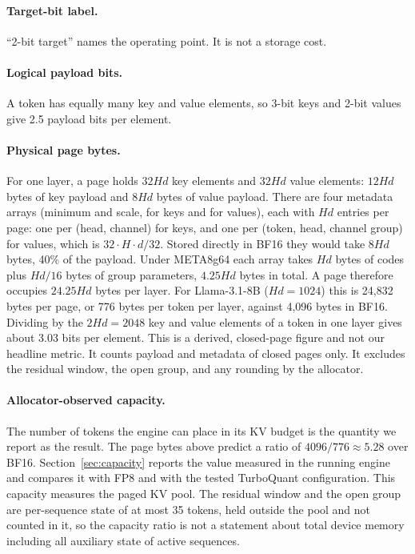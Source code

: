 \documentclass{article}
\begin{document}
\paragraph{Target-bit label.}
``2-bit target'' names the operating point. It is not a storage cost.

\paragraph{Logical payload bits.}
A token has equally many key and value elements, so 3-bit keys and 2-bit values give 2.5 payload bits
per element.

\paragraph{Physical page bytes.}
For one layer, a page holds $32Hd$ key elements and $32Hd$ value elements: $12Hd$ bytes of key payload
and $8Hd$ bytes of value payload. There are four metadata arrays (minimum and scale, for keys and for
values), each with $Hd$ entries per page: one per (head, channel) for keys, and one per (token, head,
channel group) for values, which is $32 \cdot H \cdot d/32$. Stored directly in BF16 they would take
$8Hd$ bytes, 40\% of the payload. Under META8g64 each array takes $Hd$ bytes of codes plus $Hd/16$ bytes
of group parameters, $4.25Hd$ bytes in total. A page therefore occupies $24.25Hd$ bytes per layer. For
Llama-3.1-8B ($Hd=1024$) this is 24,832 bytes per page, or 776 bytes per token per layer, against 4,096
bytes in BF16. Dividing by the $2Hd=2048$ key and value elements of a token in one layer gives about 3.03 bits per
element. This is a derived, closed-page figure and not our headline metric. It counts payload and
metadata of closed pages only. It excludes the residual window, the open group, and any rounding by
the allocator.

\paragraph{Allocator-observed capacity.}
The number of tokens the engine can place in its KV budget is the quantity we report as the result. The
page bytes above predict a ratio of $4096/776 \approx 5.28$ over BF16. Section~\ref{sec:capacity} reports the value
measured in the running engine and compares it with FP8 and with the tested TurboQuant configuration.
This capacity measures the paged KV pool. The residual window and the open group are per-sequence
state of at most 35 tokens, held outside the pool and not counted in it, so the capacity ratio is not
a statement about total device memory including all auxiliary state of active sequences.
\end{document}
